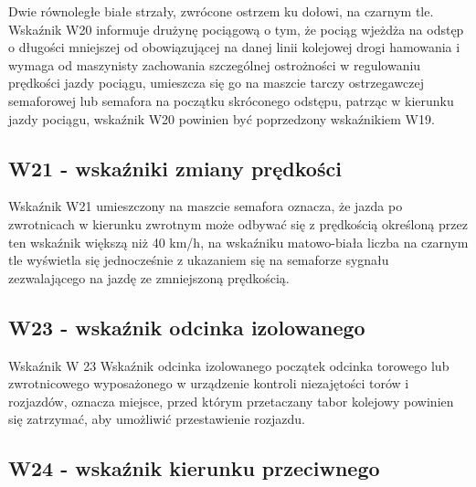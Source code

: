 Dwie równoległe białe strzały, zwrócone ostrzem ku dołowi, na czarnym tle. Wskaźnik W20 informuje drużynę pociągową o
tym, że pociąg wjeżdża na odstęp o długości mniejszej od obowiązującej na danej linii kolejowej drogi hamowania i
wymaga od maszynisty zachowania szczególnej ostrożności w regulowaniu prędkości jazdy pociągu, umieszcza się go na
maszcie tarczy ostrzegawczej semaforowej lub semafora na początku skróconego odstępu, patrząc w kierunku jazdy pociągu,
wskaźnik W20 powinien być poprzedzony wskaźnikiem W19.

\subsection{W21 - wskaźniki zmiany prędkości}

Wskaźnik W21 umieszczony na maszcie semafora oznacza, że jazda po zwrotnicach w kierunku zwrotnym może odbywać się z prędkością określoną przez ten  wskaźnik większą niż 40 km/h, na wskaźniku matowo-biała liczba na czarnym tle wyświetla się jednocześnie z ukazaniem się na semaforze sygnału zezwalającego na jazdę ze zmniejszoną prędkością.

\subsection{W23 - wskaźnik odcinka izolowanego}

Wskaźnik W 23 {\textquotedbl}Wskaźnik odcinka izolowanego{\textquotedbl} początek odcinka torowego lub zwrotnicowego
wyposażonego w urządzenie kontroli niezajętości torów i rozjazdów, oznacza miejsce, przed którym przetaczany tabor
kolejowy powinien się zatrzymać, aby umożliwić przestawienie rozjazdu.

\subsection{W24 - wskaźnik kierunku przeciwnego}

